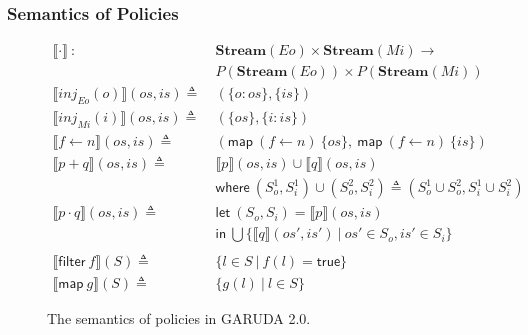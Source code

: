\documentclass[12pt, letterpaper]{article}
\newcommand\interp[1]{\llbracket #1 \rrbracket}
\def \sysname {\textsc{GARUDA 2.0}\xspace}
\begin{document}
      \subsubsection{Semantics of Policies}\label{sec:spec:sem:pol}
        \begin{figure}
          \centering
          \begin{align*} 
            \interp{ \cdot }\ 
              :\ \ &
              \mathbf{Stream}(Eo)\times \mathbf{Stream}(Mi) \rightarrow \\
              & P(\mathbf{Stream}(Eo))\times P(\mathbf{Stream}(Mi)) 
              \\ 
            \interp { inj_{Eo}(o) }(\mathit{os}, \mathit{is})
              \triangleq\ &
              (\{\mathit{o : os}\}, \{\mathit{is}\}) 
              \\
            \interp { inj_{Mi}(i) }(\mathit{os}, \mathit{is})
              \triangleq\ &
              (\{\mathit{os}\},\{ \mathit{i : is}\})
              \\
            \interp { f \leftarrow n }(os, is)
              \triangleq\ &
              (\mathsf{map}\ (f\leftarrow n)\ \{os\},\
               \mathsf{map}\ (f\leftarrow n)\ \{is\})
              \\ %
            \interp { p + q }(\mathit{os}, \mathit{is})
              \triangleq\ &
              \interp { p }(\mathit{os}, \mathit{is})\cup
              \interp { q }(\mathit{os}, \mathit{is}) \\
              &\mathsf{where}\ (S_o^1, S_i^1)\cup (S_o^2, S_i^2)\triangleq
                (S_o^1\cup S_o^2, S_i^1\cup S_i^2)\\
            \interp { p \cdot q }(\mathit{os}, \mathit{is})
              \triangleq\ &
              \mathsf{let}\ (S_o, S_i) = \interp{p}(os, is)\\
              &\mathsf{in}\ \bigcup \{\interp{q}(\mathit{os}',\mathit{is}')\ |\ \mathit{os}'\in S_o, \mathit{is'}\in S_i\}\\
              \\
            \interp{\mathsf{filter}\ f}(S)
              \triangleq\ & \{l \in S\ |\ f(l) = \mathsf{true}\}\\
            \interp{\mathsf{map}\ g}(S)
              \triangleq\ &
              \{ g(l)\ |\ l\in S \} 
          \end{align*}
          \caption{The semantics of policies in \sysname.}
          \label{fig:spec:sem:pol}
        \end{figure}
\end{document}
